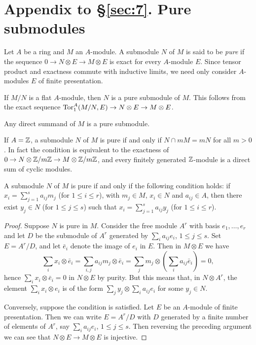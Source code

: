 \section*{Appendix to \S\ref{sec:7}. Pure submodules}
{}

Let $A$ be a ring and $M$ an $A$-module. A submodule $N$ of $M$ is said to be \emph{pure}
if the sequence $0 \to N \otimes E \to M \otimes E$ is exact for every $A$-module $E$. Since
tensor product and exactness commute with inductive limits, we need only
consider $A$-modules $E$ of finite presentation.

\begin{example}\label{ex:7.1}
If $M/N$ is a flat $A$-module, then $N$ is a pure submodule of
$M$. This follows from the exact sequence $\operatorname{Tor}^A_1(M/N, E) \to N \otimes E
\to M \otimes E$.
\end{example}

\begin{example}\label{ex:7.2}
Any direct summand of $M$ is a pure submodule.
\end{example}

\begin{example}\label{ex:7.3}
If $A = \mathbb{Z}$, a submodule $N$ of $M$ is pure if and only if $N \cap mM
= mN$ for all $m > 0$. In fact the condition is equivalent to the exactness
of $0 \to N \otimes \mathbb{Z}/m\mathbb{Z} \to M \otimes \mathbb{Z}/m\mathbb{Z}$, and every finitely generated $\mathbb{Z}$-module
is a direct sum of cyclic modules.
\end{example}

\begin{theorem}\label{thm:7.13}
A submodule $N$ of $M$ is pure if and only if the following
condition holds: if $x_i = \sum_{j=1}^{s} a_{ij}m_j$ (for $1 \le i \le r$), with $m_j \in M$, $x_i \in N$ and
$a_{ij} \in A$, then there exist $y_j \in N$ (for $1 \le j \le s$) such that $x_i = \sum_{j=1}^{s} a_{ij}y_j$
(for $1 \le i \le r$).
\end{theorem}

\begin{proof}
Suppose $N$ is pure in $M$. Consider the free module $A^r$ with basis
$e_1, \ldots, e_r$ and let $D$ be the submodule of $A^r$ generated by $\sum_i a_{ij}e_i$, $1 \le j \le s$. Set
$E = A^r/D$, and let $\bar{e}_i$ denote the image of $e_i$ in $E$. Then in $M \otimes E$ we have
\[
  \sum_i x_i \otimes \bar{e}_i = \sum_{i,j} a_{ij}m_j \otimes \bar{e}_i = \sum_j m_j \otimes \left(\sum_i a_{ij}\bar{e}_i\right) = 0,
\]
hence $\sum_i x_i \otimes \bar{e}_i = 0$ in $N \otimes E$ by purity. But this means that, in $N \otimes A^r$, the
element $\sum_i x_i \otimes e_i$ is of the form $\sum_j y_j \otimes \sum_i a_{ij}e_i$ for some $y_j \in N$.

Conversely, suppose the condition is satisfied. Let $E$ be an $A$-module of
finite presentation. Then we can write $E = A^r/D$ with $D$ generated by a finite
number of elements of $A^r$, say $\sum_i a_{ij}e_i$, $1 \le j \le s$. Then reversing the
preceding argument we can see that $N \otimes E \to M \otimes E$ is injective.
\end{proof}

